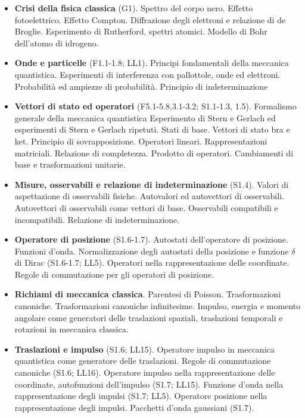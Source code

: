 \documentclass[a4paper,12pt,oneside]{book}
\begin{document}
\begin{itemize}
\item \textbf{Crisi della fisica classica} (G1). Spettro del corpo nero. Effetto fotoelettrico. Effetto Compton. Diffrazione degli elettroni e relazione di de Broglie. Esperimento di Rutherford, spettri atomici. Modello di Bohr dell'atomo di idrogeno.

\item \textbf{Onde e particelle} (F1.1-1.8; LL1). Principi fondamentali della meccanica quantistica. Esperimenti di interferenza con pallottole, onde ed elettroni. Probabilità ed ampiezze di probabilità. Principio di indeterminazione

\item \textbf{Vettori di stato ed operatori} (F5.1-5.8,3.1-3.2; S1.1-1.3, 1.5). Formalismo generale della meccanica quantistica Esperimento di Stern e Gerlach ed esperimenti di Stern e Gerlach ripetuti. Stati di base. Vettori di stato bra e ket. Principio di sovrapposizione. Operatori lineari. Rappresentazioni matriciali. Relazione di completezza. Prodotto di operatori. Cambiamenti di base e trasformazioni unitarie.

\item \textbf{Misure, osservabili e relazione di indeterminazione} (S1.4). Valori di aspettazione di osservabili fisiche. Autovalori ed autovettori di osservabili. Autovettori di osservabili come vettori di base. Osservabili compatibili e incompatibili. Relazione di indeterminazione.

\item \textbf{Operatore di posizione} (S1.6-1.7). Autostati dell'operatore di posizione. Funzioni d'onda. Normalizzazione degli autostati della posizione e funzione $\delta$ di Dirac (S1.6-1.7; LL5). Operatori nella rappresentazione delle coordinate. Regole di commutazione per gli operatori di posizione. 

\item \textbf{Richiami di meccanica classica}. Parentesi di Poisson. Trasformazioni canoniche. Trasformazioni canoniche infinitesime. Impulso, energia e momento angolare come generatori delle traslazioni spaziali, traslazioni temporali e rotazioni in meccanica classica.

\item \textbf{Traslazioni e impulso} (S1.6; LL15). Operatore impulso in meccanica quantistica come generatore delle traslazioni. Regole di commutazione canoniche (S1.6; LL16). Operatore impulso nella rappresentazione delle coordinate, autofunzioni dell'impulso (S1.7; LL15). Funzione d'onda nella rappresentazione degli impulsi (S1.7; LL5). Operatore posizione nella rappresentazione degli impulsi. Pacchetti d'onda gaussiani (S1.7).


\end{itemize}
\end{document}
